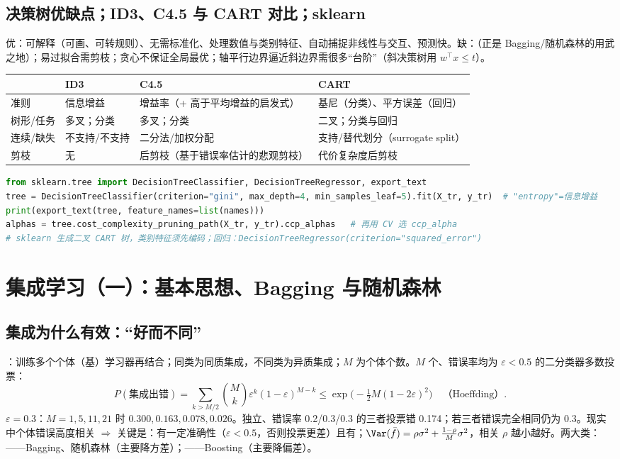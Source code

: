 \subsection{决策树优缺点；ID3、C4.5 与 CART 对比；sklearn}
优：可解释（可画、可转规则）、无需标准化、处理数值与类别特征、自动捕捉非线性与交互、预测快。缺：（正是 Bagging/随机森林的用武之地）；易过拟合需剪枝；贪心不保证全局最优；轴平行边界逼近斜边界需很多“台阶”（斜决策树用 $w^\top x\le t$）。
\begin{center}\small
\begin{tabularx}{\linewidth}{@{}p{1.5cm}p{2.4cm}p{5.4cm}L@{}}
\toprule
 & ID3 & C4.5 & CART \\
\midrule
准则 & 信息增益 & 增益率（+ 高于平均增益的启发式） & 基尼（分类）、平方误差（回归） \\
树形/任务 & 多叉；分类 & 多叉；分类 & 二叉；分类与回归 \\
连续/缺失 & 不支持/不支持 & 二分法/加权分配 & 支持/替代划分（surrogate split） \\
剪枝 & 无 & 后剪枝（基于错误率估计的悲观剪枝） & 代价复杂度后剪枝 \\
\bottomrule
\end{tabularx}
\end{center}
\begin{lstlisting}[language=Python,basicstyle=\ttfamily\footnotesize]
from sklearn.tree import DecisionTreeClassifier, DecisionTreeRegressor, export_text
tree = DecisionTreeClassifier(criterion="gini", max_depth=4, min_samples_leaf=5).fit(X_tr, y_tr)  # "entropy"=信息增益
print(export_text(tree, feature_names=list(names)))
alphas = tree.cost_complexity_pruning_path(X_tr, y_tr).ccp_alphas   # 再用 CV 选 ccp_alpha
# sklearn 生成二叉 CART 树，类别特征须先编码；回归：DecisionTreeRegressor(criterion="squared_error")
\end{lstlisting}

\section{集成学习（一）：基本思想、Bagging 与随机森林}

\subsection{集成为什么有效：“好而不同”}
：训练多个个体（基）学习器再结合；同类为同质集成，不同类为异质集成；$M$ 为个体个数。$M$ 个、错误率均为 $\varepsilon<0.5$ 的二分类器多数投票：
\[
P(\text{集成出错})=\sum_{k>M/2}\binom Mk\varepsilon^k(1-\varepsilon)^{M-k}\le\exp\!\Big(-\tfrac12M(1-2\varepsilon)^2\Big)\quad\text{（Hoeffding）}.
\]
$\varepsilon=0.3$：$M=1,5,11,21$ 时 $0.300,0.163,0.078,0.026$。独立、错误率 0.2/0.3/0.3 的三者投票错 0.174；若三者错误完全相同仍为 0.3。现实中个体错误高度相关 $\Rightarrow$ 关键是：有一定准确性（$\varepsilon<0.5$，否则投票更差）且有；$\Var(\bar f)=\rho\sigma^2+\frac{1-\rho}M\sigma^2$，相关 $\rho$ 越小越好。两大类：——Bagging、随机森林（主要降方差）；——Boosting（主要降偏差）。

